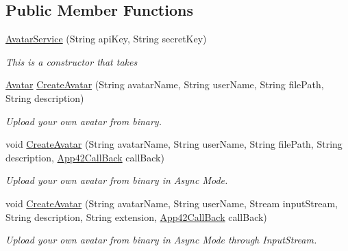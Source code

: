 \subsection*{Public Member Functions}
\begin{DoxyCompactItemize}
\item 
\hyperlink{classcom_1_1shephertz_1_1app42_1_1paas_1_1sdk_1_1csharp_1_1avatar_1_1_avatar_service_ad4c8fe6d1b1350e462bc75caf62a394b}{Avatar\+Service} (String api\+Key, String secret\+Key)
\begin{DoxyCompactList}\small\item\em This is a constructor that takes \end{DoxyCompactList}\item 
\hyperlink{classcom_1_1shephertz_1_1app42_1_1paas_1_1sdk_1_1csharp_1_1avatar_1_1_avatar}{Avatar} \hyperlink{classcom_1_1shephertz_1_1app42_1_1paas_1_1sdk_1_1csharp_1_1avatar_1_1_avatar_service_af3e678f74bfb9454e6a4b0d9fe40e90a}{Create\+Avatar} (String avatar\+Name, String user\+Name, String file\+Path, String description)
\begin{DoxyCompactList}\small\item\em Upload your own avatar from binary. \end{DoxyCompactList}\item 
void \hyperlink{classcom_1_1shephertz_1_1app42_1_1paas_1_1sdk_1_1csharp_1_1avatar_1_1_avatar_service_a8a44f81842d5a1e69cdc9836d058bf14}{Create\+Avatar} (String avatar\+Name, String user\+Name, String file\+Path, String description, \hyperlink{interfacecom_1_1shephertz_1_1app42_1_1paas_1_1sdk_1_1csharp_1_1_app42_call_back}{App42\+Call\+Back} call\+Back)
\begin{DoxyCompactList}\small\item\em Upload your own avatar from binary in Async Mode. \end{DoxyCompactList}\item 
void \hyperlink{classcom_1_1shephertz_1_1app42_1_1paas_1_1sdk_1_1csharp_1_1avatar_1_1_avatar_service_a83c394918d1712f1eff53812cbfeeb04}{Create\+Avatar} (String avatar\+Name, String user\+Name, Stream input\+Stream, String description, String extension, \hyperlink{interfacecom_1_1shephertz_1_1app42_1_1paas_1_1sdk_1_1csharp_1_1_app42_call_back}{App42\+Call\+Back} call\+Back)
\begin{DoxyCompactList}\small\item\em Upload your own avatar from binary in Async Mode through Input\+Stream. \end{DoxyCompactList}\item 

\end{DoxyCompactItemize}
